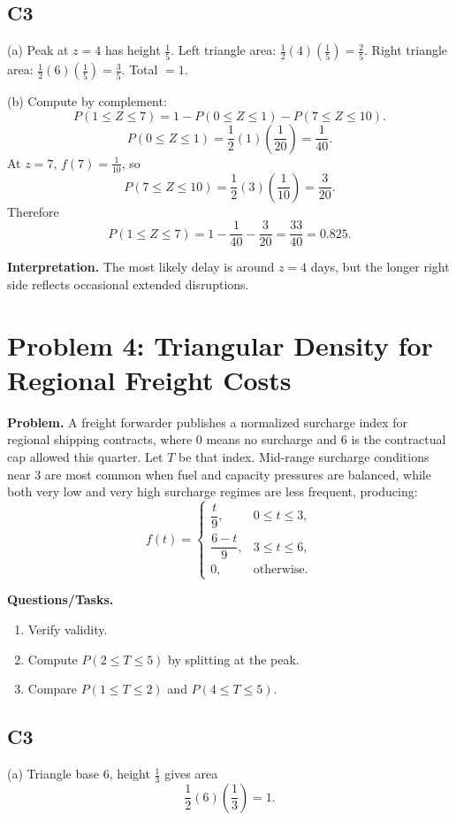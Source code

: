 \subsection*{C3}
(a) Peak at $z=4$ has height $\frac15$.
Left triangle area: $\frac12(4)(\frac15)=\frac25$.
Right triangle area: $\frac12(6)(\frac15)=\frac35$.
Total $=1$.

(b) Compute by complement:
\[
P(1\le Z\le 7)=1-P(0\le Z\le 1)-P(7\le Z\le 10).
\]
\[
P(0\le Z\le 1)=\frac12(1)\left(\frac1{20}\right)=\frac1{40}.
\]
At $z=7$, $f(7)=\frac{1}{10}$, so
\[
P(7\le Z\le 10)=\frac12(3)\left(\frac{1}{10}\right)=\frac{3}{20}.
\]
Therefore
\[
P(1\le Z\le 7)=1-\frac1{40}-\frac3{20}=\frac{33}{40}=0.825.
\]

\textbf{Interpretation.}
The most likely delay is around $z=4$ days, but the longer right side reflects occasional extended disruptions.

\section{Problem 4: Triangular Density for Regional Freight Costs}

\textbf{Problem.}
A freight forwarder publishes a normalized surcharge index for regional shipping contracts, where $0$ means no surcharge and $6$ is the contractual cap allowed this quarter. Let $T$ be that index. Mid-range surcharge conditions near $3$ are most common when fuel and capacity pressures are balanced, while both very low and very high surcharge regimes are less frequent, producing:
\[
f(t)=\begin{cases}
\dfrac{t}{9}, & 0\le t\le 3,\\
\dfrac{6-t}{9}, & 3\le t\le 6,\\
0, & \text{otherwise.}
\end{cases}
\]

\textbf{Questions/Tasks.}
\begin{enumerate}[label=(\alph*)]
\item Verify validity.
\item Compute $P(2\le T\le 5)$ by splitting at the peak.
\item Compare $P(1\le T\le 2)$ and $P(4\le T\le 5)$.
\end{enumerate}

\subsection*{C3}
(a) Triangle base $6$, height $\frac13$ gives area
\[
\frac12(6)\left(\frac13\right)=1.
\]

